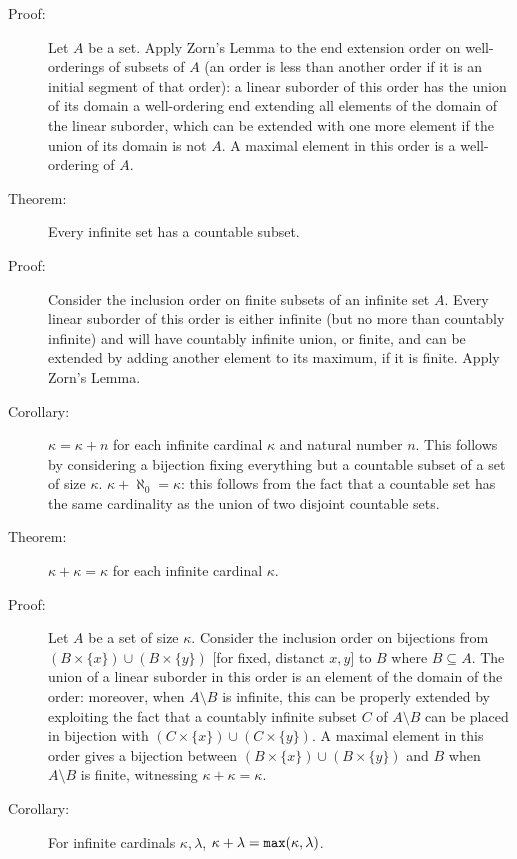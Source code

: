 \documentclass[12pt]{article}
\begin{document}
\begin{description}
\item[Proof:]  Let $A$ be a set.  Apply Zorn's Lemma to the end extension order on well-orderings of subsets of $A$ (an order is less than another order if it is an initial segment of that order):  a linear suborder of this order has the union of its domain a well-ordering end extending all elements of the domain of the linear suborder, which can be extended with one more element if the union of its domain is not $A$.  A maximal element in this order is a well-ordering of $A$.

\item[Theorem:]  Every infinite set has a countable subset.

\item[Proof:]  Consider the inclusion order on finite subsets of an infinite set $A$.  Every linear suborder of this order is either infinite (but no more than countably infinite) and will have countably infinite union, or finite, and can be extended by adding another element to its maximum, if it is finite.  Apply Zorn's Lemma.

\item[Corollary:]  $\kappa = \kappa +n$ for each infinite cardinal $\kappa$ and natural number $n$.  This follows by considering a bijection fixing everything but a countable subset of a set of size $\kappa$.  $\kappa + \aleph_0 = \kappa$:  this follows from the fact that a countable set has the same cardinality as the union of two disjoint countable sets.

\item[Theorem:]  $\kappa+\kappa = \kappa$ for each infinite cardinal $\kappa$.

\item[Proof:]  Let $A$ be a set of size $\kappa$.  Consider the inclusion order on bijections from $(B \times \{x\}) \cup (B \times \{y\})$ [for fixed, distanct $x,y$] to $B$ where $B \subseteq A$.  The union of a linear suborder in this order is an element of the domain of the order:  moreover, when $A \setminus B$ is infinite, this can be properly extended
by exploiting the fact that a countably infinite subset $C$ of $A \setminus B$ can be placed in bijection with $(C \times \{x\}) \cup (C \times \{y\})$.  A maximal element in this order gives a bijection between $(B \times \{x\}) \cup (B \times \{y\})$ and $B$ when $A \setminus B$ is finite, witnessing $\kappa+\kappa=\kappa$.

\item[Corollary:]  For infinite cardinals $\kappa, \lambda$, $\kappa+\lambda={\tt max}(\kappa,\lambda)$.


\end{description}
\end{document}
